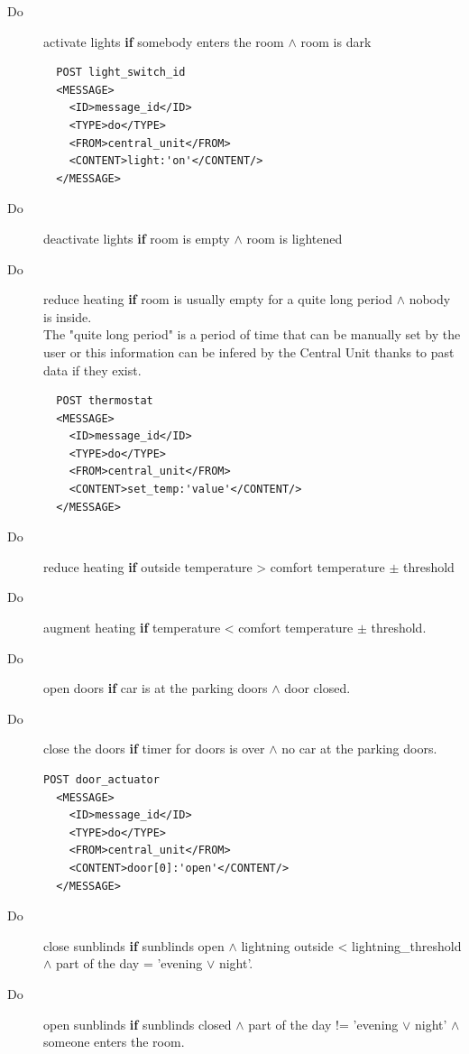 \documentclass{acm_proc_article-sp}
\begin{document}
\begin{description}
 \item[Do] activate lights \textbf{if} somebody enters the room $\land$ room is dark\\
 \begin{verbatim}
  POST light_switch_id 
  <MESSAGE>
    <ID>message_id</ID>
    <TYPE>do</TYPE>
    <FROM>central_unit</FROM>
    <CONTENT>light:'on'</CONTENT/>
  </MESSAGE> 
\end{verbatim}
 \item[Do] deactivate lights \textbf{if} room is empty $\land$ room is lightened
 \item[Do] reduce heating \textbf{if} room is usually empty for a quite long period $\land$ nobody is inside.\\
 The "quite long period" is a period of time that can be manually set by the user or this information can be infered by the Central Unit thanks to past data if they exist.
 \begin{verbatim}
  POST thermostat 
  <MESSAGE>
    <ID>message_id</ID>
    <TYPE>do</TYPE>
    <FROM>central_unit</FROM>
    <CONTENT>set_temp:'value'</CONTENT/>
  </MESSAGE> 
\end{verbatim}
 \item[Do] reduce heating \textbf{if} outside temperature > comfort temperature $\pm$ threshold
 \item[Do] augment heating \textbf{if} temperature < comfort temperature $\pm$ threshold.
 \item[Do] open doors \textbf{if} car is at the parking doors $\land$ door closed.
 \item[Do] close the doors \textbf{if} timer for doors is over $\land$ no car at the parking doors.\\
 \begin{verbatim}
POST door_actuator
  <MESSAGE>
    <ID>message_id</ID>
    <TYPE>do</TYPE>
    <FROM>central_unit</FROM>
    <CONTENT>door[0]:'open'</CONTENT/>
  </MESSAGE> 
\end{verbatim}
 \item[Do] close sunblinds \textbf{if} sunblinds open $\land$ lightning outside < lightning\_threshold $\land$ part of the day = ’evening $\lor$ night’.
 \item[Do] open sunblinds \textbf{if} sunblinds closed $\land$ part of the day != ’evening $\lor$ night’ $\land$ someone enters the room.
\end{description}
\end{document}
